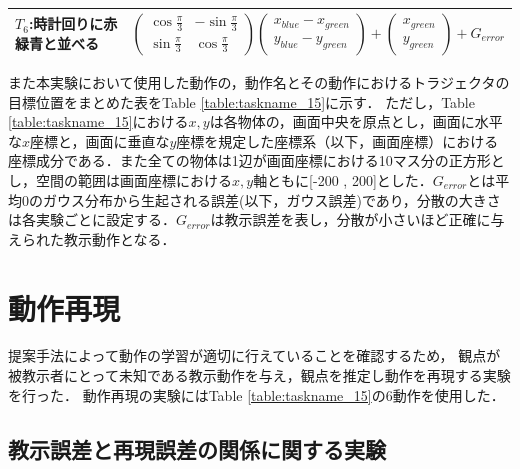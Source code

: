 \begin{table}[h]
\begin{tabular}{|l|l|}
    	$T_{6}$:時計回りに赤緑青と並べる & 
	$
	\begin{pmatrix}
        	\cos \frac{\pi}{3} & -\sin \frac{\pi}{3} \\
        	\sin \frac{\pi}{3} & \cos \frac{\pi}{3}
	\end{pmatrix}
	\begin{pmatrix}
        	x_{blue}-x_{green} \\
        	y_{blue}-y_{green}
	\end{pmatrix}
      	+
	\begin{pmatrix}
        	x_{green} \\
        	y_{green}
	\end{pmatrix}      	
	+G_{error}
    	$
    	\\ \hline
  	\end{tabular}
\end{table}
また本実験において使用した動作の，動作名とその動作におけるトラジェクタの目標位置をまとめた表をTable \ref{table:taskname_15}に示す．
ただし，Table \ref{table:taskname_15}における$x , y$は各物体の，画面中央を原点とし，画面に水平な$x$座標と，画面に垂直な$y$座標を規定した座標系（以下，画面座標）における座標成分である．また全ての物体は1辺が画面座標における10マス分の正方形とし，空間の範囲は画面座標における$x,y$軸ともに[-200 , 200]とした．$G_{error}$とは平均0のガウス分布から生起される誤差(以下，ガウス誤差)であり，分散の大きさは各実験ごとに設定する．$G_{error}$は教示誤差を表し，分散が小さいほど正確に与えられた教示動作となる．


\section{動作再現}

提案手法によって動作の学習が適切に行えていることを確認するため，
観点が被教示者にとって未知である教示動作を与え，観点を推定し動作を再現する実験を行った．
動作再現の実験にはTable \ref{table:taskname_15}の6動作を使用した．

\subsection{教示誤差と再現誤差の関係に関する実験}

